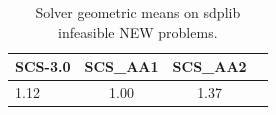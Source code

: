 \begin{table}
\centering
\caption{Solver geometric means on sdplib infeasible NEW problems.}
\label{t-sdplib infeasible NEW-geom_mean}
\begin{tabular}{lccc}
\toprule
 SCS-3.0 &  SCS\_AA1 &  SCS\_AA2 \\
\midrule
    1.12 &     1.00 &     1.37 \\
\bottomrule
\end{tabular}
\end{table}
